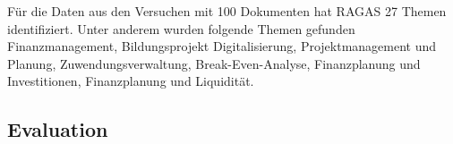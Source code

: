 Für die Daten aus den Versuchen mit 100 Dokumenten hat RAGAS 27 Themen identifiziert. Unter anderem wurden folgende Themen gefunden\\
Finanzmanagement, Bildungsprojekt Digitalisierung, Projektmanagement und Planung, Zuwendungsverwaltung, Break-Even-Analyse, Finanzplanung und Investitionen, Finanzplanung und Liquidität.

\subsection{Evaluation}